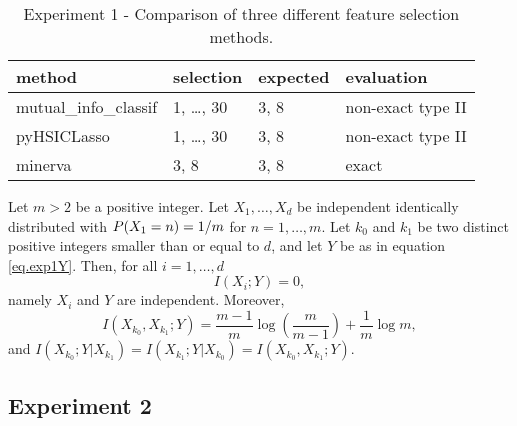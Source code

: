 \begin{table}
	\centering
{
	\begin{tabular}{l|l|l|l}
		\textbf{method}
		&
		\textbf{selection}
		&
		\textbf{expected}
		&
		\textbf{evaluation}
		\\
		\hline
		mutual\_info\_classif
		&
		1, \dots, 30
		& 
		3, 8
		&
		non-exact type II
		\\
		pyHSICLasso
		&
		1, \dots, 30
		& 
		3, 8
		&
		non-exact type II
		\\
		minerva
		& 
		3, 8
		&
		3, 8
		&
		exact
	\end{tabular}
}
\caption{Experiment 1 - Comparison of three different feature selection methods.}
\label{tab.experiment1}
\end{table}






\begin{lemma}
	\label{lemma.experiment1}
	Let $m>2$ be a positive integer. 
	Let
	$X_1, \dots, X_d$
	be independent identically distributed
	with 
	${{P}}(X_1 = n) = 1 / m$
	for $n=1, \dots, m$. 
	Let 
	$k_0$ and $k_1$ 
	be two distinct positive integers 
	smaller than or equal to $d$,
	and let $Y$
	be as in equation \eqref{eq.exp1Y}.
	Then,
	for all $i=1, \dots, d$
	\begin{equation}
		\label{eq.exp1pairwisemi}
		I(X_i; Y) = 0,
	\end{equation}
	namely $X_i$ and $Y$ are independent. 
	Moreover,
	\begin{equation}
		\label{eq.exp1mi}
		I(X_{k_0}, X_{k_1}; Y) 
		=
			\frac{m-1}{m} \log\left(\frac{m}{m-1}\right)
			+
			\frac{1}{m}\log m
			,
	\end{equation}
	and $I(X_{k_0}; Y \lvert X_{k_1}) = I(X_{k_1}; Y \lvert X_{k_0})  = I(X_{k_0}, X_{k_1} ; Y)$.
\end{lemma}




\subsection{Experiment 2}

